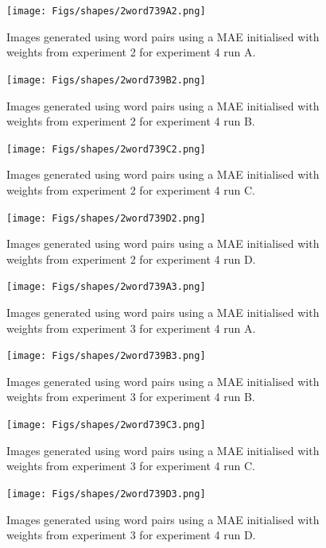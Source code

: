 \begin{figure}
\centering
\texttt{[image: Figs/shapes/2word739A2.png]}
\caption{Images generated using word pairs using a MAE initialised with weights from experiment 2 for experiment 4 run A.}
\label{fig:2word739A2}
\end{figure}

\begin{figure}
\centering
\texttt{[image: Figs/shapes/2word739B2.png]}
\caption{Images generated using word pairs using a MAE initialised with weights from experiment 2 for experiment 4 run B.}
\label{fig:2word739B2}
\end{figure}

\begin{figure}
\centering
\texttt{[image: Figs/shapes/2word739C2.png]}
\caption{Images generated using word pairs using a MAE initialised with weights from experiment 2 for experiment 4 run C.}
\label{fig:2word739C2}
\end{figure}

\begin{figure}
\centering
\texttt{[image: Figs/shapes/2word739D2.png]}
\caption{Images generated using word pairs using a MAE initialised with weights from experiment 2 for experiment 4 run D.}
\label{fig:2word739D2}
\end{figure}


\begin{figure}
\centering
\texttt{[image: Figs/shapes/2word739A3.png]}
\caption{Images generated using word pairs using a MAE initialised with weights from experiment 3 for experiment 4 run A.}
\label{fig:2word739A3}
\end{figure}

\begin{figure}
\centering
\texttt{[image: Figs/shapes/2word739B3.png]}
\caption{Images generated using word pairs using a MAE initialised with weights from experiment 3 for experiment 4 run B.}
\label{fig:2word739B3}
\end{figure}

\begin{figure}
\centering
\texttt{[image: Figs/shapes/2word739C3.png]}
\caption{Images generated using word pairs using a MAE initialised with weights from experiment 3 for experiment 4 run C.}
\label{fig:2word739C3}
\end{figure}

\begin{figure}
\centering
\texttt{[image: Figs/shapes/2word739D3.png]}
\caption{Images generated using word pairs using a MAE initialised with weights from experiment 3 for experiment 4 run D.}
\label{fig:2word739D3}
\end{figure}



